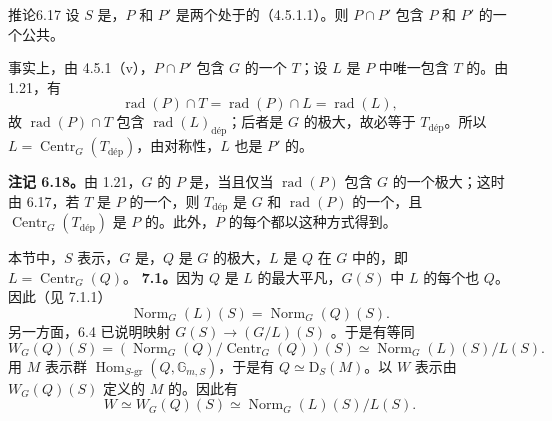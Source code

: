 \begin{SGAresult}{推论}{6.17}
设 $S$ 是，$P$ 和 $P'$ 是两个处于的（4.5.1.1）。则 $P\cap P'$ 包含 $P$ 和 $P'$ 的一个公共。
\end{SGAresult}
事实上，由 4.5.1（v），$P\cap P'$ 包含 $G$ 的一个 $T$；设 $L$ 是 $P$ 中唯一包含 $T$ 的。由 1.21，有
\[
 \operatorname{rad}(P)\cap T=\operatorname{rad}(P)\cap L=\operatorname{rad}(L),
\]
故 $\operatorname{rad}(P)\cap T$ 包含 $\operatorname{rad}(L)_{\mathrm{d\text{é}p}}$；后者是 $G$ 的极大，故必等于 $T_{\mathrm{d\text{é}p}}$。所以 $L=\operatorname{Centr}_G(T_{\mathrm{d\text{é}p}})$，由对称性，$L$ 也是 $P'$ 的。

\textbf{注记 6.18。}由 1.21，$G$ 的 $P$ 是，当且仅当 $\operatorname{rad}(P)$ 包含 $G$ 的一个极大；这时由 6.17，若 $T$ 是 $P$ 的一个，则 $T_{\mathrm{d\text{é}p}}$ 是 $G$ 和 $\operatorname{rad}(P)$ 的一个，且 $\operatorname{Centr}_G(T_{\mathrm{d\text{é}p}})$ 是 $P$ 的。此外，$P$ 的每个都以这种方式得到。

本节中，$S$ 表示，$G$ 是，$Q$ 是 $G$ 的极大，$L$ 是 $Q$ 在 $G$ 中的，即 $L=\operatorname{Centr}_G(Q)$。
\textbf{7.1。}因为 $Q$ 是 $L$ 的最大平凡，$G(S)$ 中 $L$ 的每个也 $Q$。因此（见 7.1.1）
\[
 \operatorname{Norm}_G(L)(S)=\operatorname{Norm}_G(Q)(S).
\]
另一方面，6.4 已说明映射 $G(S)\to(G/L)(S)$ 。于是有等同
\[
 W_G(Q)(S)=(\operatorname{Norm}_G(Q)/\operatorname{Centr}_G(Q))(S)
 \simeq\operatorname{Norm}_G(L)(S)/L(S).
\]
用 $M$ 表示群 $\operatorname{Hom}_{S\text{-gr}}(Q,\mathbb G_{m,S})$，于是有 $Q\simeq\mathrm D_S(M)$。以 $W$ 表示由 $W_G(Q)(S)$ 定义的 $M$ 的。因此有
\[
 W\simeq W_G(Q)(S)\simeq\operatorname{Norm}_G(L)(S)/L(S).
\]

